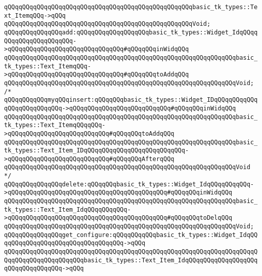 \verb|qQQqqQQqqQQqqQQqqQQqqQQqqQQqqQQqqQQqqQQqqQQqqQQqqQQqbasic_tk_types::Text_ItemqQQq->qQQq|\newline
\verb|qQQqqQQqqQQqqQQqqQQqqQQqqQQqqQQqqQQqqQQqqQQqqQQqqQQqVoid;|\newline
\newline
\verb|qQQqqQQqqQQqqQQqadd:qQQqqQQqqQQqqQQqqQQqbasic_tk_types::Widget_IdqQQqqQQqqQQqqQQqqQQqqQQq->qQQqqQQqqQQqqQQqqQQqqQQqqQQqqQQq#qQQqqQQqinWidqQQq|\newline
\verb|qQQqqQQqqQQqqQQqqQQqqQQqqQQqqQQqqQQqqQQqqQQqqQQqqQQqqQQqqQQqqQQqbasic_tk_types::Text_ItemqQQq->qQQqqQQqqQQqqQQqqQQqqQQqqQQqqQQq#qQQqqQQqtoAddqQQq|\newline
\verb|qQQqqQQqqQQqqQQqqQQqqQQqqQQqqQQqqQQqqQQqqQQqqQQqqQQqqQQqqQQqqQQqVoid;|\newline
\verb|/*|\newline
\verb|qQQqqQQqqQQqmyqQQqinsert:qQQqqQQqbasic_tk_types::Widget_IDqQQqqQQqqQQqqQQqqQQqqQQqqQQq->qQQqqQQqqQQqqQQqqQQqqQQqqQQq#qQQqqQQqinWidqQQq|\newline
\verb|qQQqqQQqqQQqqQQqqQQqqQQqqQQqqQQqqQQqqQQqqQQqqQQqqQQqqQQqqQQqqQQqbasic_tk_types::Text_ItemqQQqqQQq->qQQqqQQqqQQqqQQqqQQqqQQqqQQq#qQQqqQQqtoAddqQQq|\newline
\verb|qQQqqQQqqQQqqQQqqQQqqQQqqQQqqQQqqQQqqQQqqQQqqQQqqQQqqQQqqQQqqQQqbasic_tk_types::Text_Item_IDqQQqqQQqqQQqqQQqqQQqqQQqqQQq->qQQqqQQqqQQqqQQqqQQqqQQqqQQq#qQQqqQQqAfterqQQq|\newline
\verb|qQQqqQQqqQQqqQQqqQQqqQQqqQQqqQQqqQQqqQQqqQQqqQQqqQQqqQQqqQQqqQQqVoid|\newline
\verb|*/|\newline
\newline
\verb|qQQqqQQqqQQqqQQqdelete:qQQqqQQqbasic_tk_types::Widget_IdqQQqqQQqqQQq->qQQqqQQqqQQqqQQqqQQqqQQqqQQqqQQqqQQqqQQqqQQq#qQQqqQQqinWidqQQq|\newline
\verb|qQQqqQQqqQQqqQQqqQQqqQQqqQQqqQQqqQQqqQQqqQQqqQQqqQQqqQQqqQQqqQQqbasic_tk_types::Text_Item_IdqQQqqQQqqQQq->qQQqqQQqqQQqqQQqqQQqqQQqqQQqqQQqqQQqqQQqqQQq#qQQqqQQqtoDelqQQq|\newline
\verb|qQQqqQQqqQQqqQQqqQQqqQQqqQQqqQQqqQQqqQQqqQQqqQQqqQQqqQQqqQQqqQQqVoid;|\newline
\newline
\newline
\newline
\verb|qQQqqQQqqQQqqQQqget_configure:qQQqqQQqqQQqbasic_tk_types::Widget_IdqQQqqQQqqQQqqQQqqQQqqQQqqQQqqQQqqQQq->qQQq|\newline
\verb|qQQqqQQqqQQqqQQqqQQqqQQqqQQqqQQqqQQqqQQqqQQqqQQqqQQqqQQqqQQqqQQqqQQqqQQqqQQqqQQqqQQqqQQqqQQqbasic_tk_types::Text_Item_IdqQQqqQQqqQQqqQQqqQQqqQQqqQQqqQQqqQQq->qQQq|\newline
